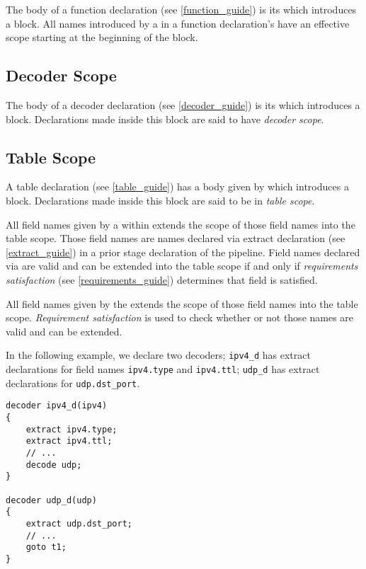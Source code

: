 The body of a function declaration (see \ref{function_guide}) is its  which introduces a block. All names introduced by a  in a function declaration's  have an effective scope starting at the beginning of the block.

\subsection{Decoder Scope} \label{decoder_scope}

The body of a decoder declaration (see \ref{decoder_guide}) is its  which introduces a block. Declarations made inside this block are said to have \textit{decoder scope}.

\subsection{Table Scope} \label{table_scope}

A table declaration (see \ref{table_guide}) has a body given by  which introduces a block. Declarations made inside this block are said to be in \textit{table scope}.

All field names given by a  within  extends the scope of those field names into the table scope. Those field names are names declared via extract declaration (see \ref{extract_guide}) in a prior stage declaration of the pipeline. Field names declared via  are valid and can be extended into the table scope if and only if \textit{requirements satisfaction} (see \ref{requirements_guide}) determines that field is satisfied.

All field names given by the  extends the scope of those field names into the table scope. \textit{Requirement satisfaction} is used to check whether or not those names are valid and can be extended.

In the following example, we declare two decoders; \texttt{ipv4\_d} has extract declarations for field names \texttt{ipv4.type} and \texttt{ipv4.ttl}; \texttt{udp\_d} has extract declarations for \texttt{udp.dst\_port}.

\begin{minip}
\begin{lstlisting}
decoder ipv4_d(ipv4)
{
	extract ipv4.type;
	extract ipv4.ttl;
	// ...
	decode udp;
}

decoder udp_d(udp)
{
	extract udp.dst_port;
	// ...
	goto t1;
}
\end{lstlisting}
\end{minip}


